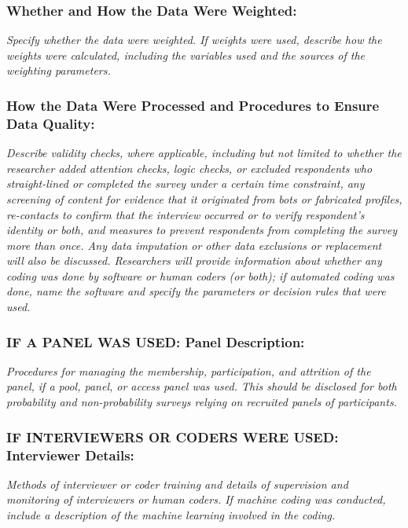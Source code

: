 \documentclass{article}
\begin{document}
\subsubsection*{Whether and How the Data Were Weighted:} \textit{Specify whether the data were weighted. If weights were used, describe how the weights were calculated, including the variables used and the sources of the weighting parameters.}



\subsubsection*{How the Data Were Processed and Procedures to Ensure Data Quality:} \textit{Describe validity checks, where applicable, including but not limited to whether the researcher added attention checks, logic checks, or excluded respondents who straight-lined or completed the survey under a certain time constraint, any screening of content for evidence that it originated from bots or fabricated profiles, re-contacts to confirm that the interview occurred or to verify respondent's identity or both, and measures to prevent respondents from completing the survey more than once. Any data imputation or other data exclusions or replacement will also be discussed. Researchers will provide information about whether any coding was done by software or human coders (or both); if automated coding was done, name the software and specify the parameters or decision rules that were used.}



\subsubsection*{IF A PANEL WAS USED: Panel Description:} \textit{Procedures for managing the membership, participation, and attrition of the panel, if a pool, panel, or access panel was used. This should be disclosed for both probability and non-probability surveys relying on recruited panels of participants.}



\subsubsection*{IF INTERVIEWERS OR CODERS WERE USED: Interviewer Details:} \textit{Methods of interviewer or coder training and details of supervision and monitoring of interviewers or human coders. If machine coding was conducted, include a description of the machine learning involved in the coding.}
\end{document}
